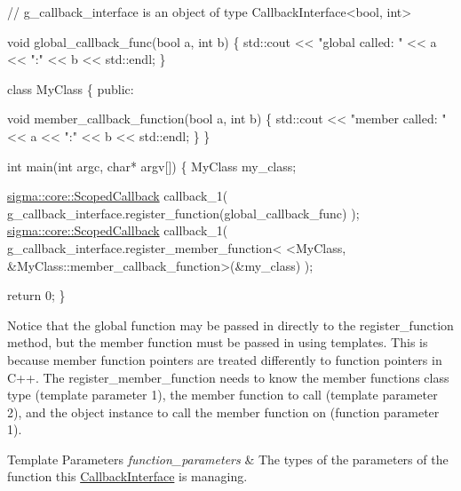 \begin{DoxyCode}
\textcolor{comment}{// g\_callback\_interface is an object of type CallbackInterface<bool, int>}

\textcolor{keywordtype}{void} global\_callback\_func(\textcolor{keywordtype}{bool} a, \textcolor{keywordtype}{int} b)
\{
    std::cout << \textcolor{stringliteral}{"global called: "} << a << \textcolor{stringliteral}{":"} << b << std::endl;
\}

\textcolor{keyword}{class }MyClass
\{
\textcolor{keyword}{public}:

    \textcolor{keywordtype}{void} member\_callback\_function(\textcolor{keywordtype}{bool} a, \textcolor{keywordtype}{int} b)
    \{
        std::cout << \textcolor{stringliteral}{"member called: "} << a << \textcolor{stringliteral}{":"} << b << std::endl;
    \}
\}

\textcolor{keywordtype}{int} main(\textcolor{keywordtype}{int} argc, \textcolor{keywordtype}{char}* argv[])
\{
    MyClass my\_class;

    \hyperlink{classsigma_1_1core_1_1_scoped_callback}{sigma::core::ScopedCallback} callback\_1(
            g\_callback\_interface.register\_function(global\_callback\_func)
    );
    \hyperlink{classsigma_1_1core_1_1_scoped_callback}{sigma::core::ScopedCallback} callback\_1(
            g\_callback\_interface.register\_member\_function<
                    <MyClass, &MyClass::member\_callback\_function>(&my\_class)
    );

    \textcolor{keywordflow}{return} 0;
\}
\end{DoxyCode}


Notice that the global function may be passed in directly to the {\ttfamily register\+\_\+function method}, but the member function must be passed in using templates. This is because member function pointers are treated differently to function pointers in C++. The {\ttfamily register\+\_\+member\+\_\+function} needs to know the member functions class type (template parameter 1), the member function to call (template parameter 2), and the object instance to call the member function on (function parameter 1).


\begin{DoxyTemplParams}{Template Parameters}
{\em function\+\_\+parameters} & The types of the parameters of the function this \hyperlink{classsigma_1_1core_1_1_callback_interface}{Callback\+Interface} is managing. \\
\hline
\end{DoxyTemplParams}


